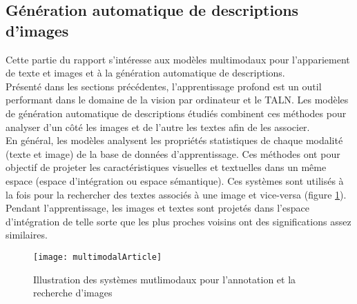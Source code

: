 \pagestyle{fancy}

\renewcommand{\footrulewidth}{1pt}

\fancyhead[C]{\thepage}

\fancyfoot[C]{\thepage}


\subsection{Génération automatique de descriptions d'images} \label{associationit}
\qquad Cette partie du rapport s'intéresse aux modèles multimodaux  pour l'appariement de texte et images et à la génération automatique de descriptions.\\
Présenté  dans les sections précédentes, l'apprentissage profond est un outil performant dans le domaine de la vision par ordinateur et le TALN. Les modèles de génération automatique de descriptions étudiés combinent ces méthodes pour analyser d'un côté les images et de l'autre les textes afin de les associer.\\
En général, les modèles analysent les propriétés statistiques de chaque modalité (texte et image) de la base de données d'apprentissage. Ces méthodes ont pour objectif de projeter les caractéristiques visuelles et textuelles dans un même espace (espace d'intégration ou espace sémantique). Ces systèmes sont utilisés à la fois pour la rechercher des textes associés à une image et vice-versa (figure \ref{fig:multimodal}). Pendant l'apprentissage, les images et textes sont projetés dans l'espace d'intégration de telle sorte que les plus proches voisins ont des significations assez similaires.\\

\begin{figure}[h]
	\begin{center}
		\texttt{[image: multimodalArticle]}
		\caption{Illustration des systèmes mutlimodaux pour l'annotation et la recherche d'images \cite{bernardi2016automatic} \label{fig:multimodal}}
	\end{center}
\end{figure}

